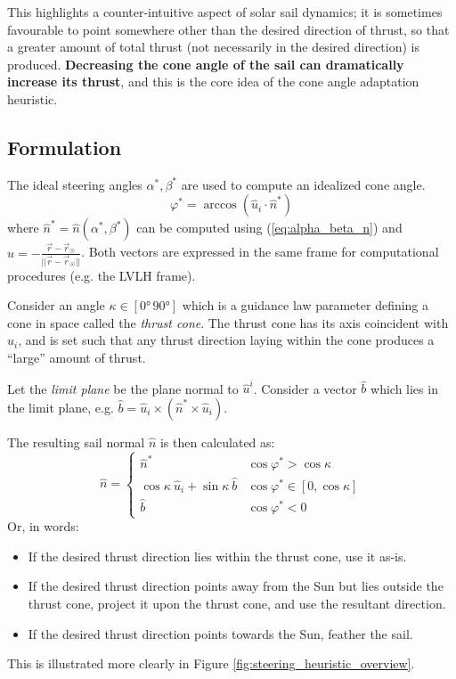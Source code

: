 This highlights a counter-intuitive aspect of solar sail dynamics; it is sometimes favourable to point somewhere other than the desired direction of thrust, so that a greater amount of total thrust (not necessarily in the desired direction) is produced. \textbf{Decreasing the cone angle of the sail can dramatically increase its thrust}, and this is the core idea of the cone angle adaptation heuristic.

\subsection{Formulation}
The ideal steering angles \(\alpha^*, \beta^*\) are used to compute an idealized cone angle.
\begin{equation}
  \varphi^* = \arccos(\hat{u}_i \cdot \hat{n}^*)
  \label{eq:cone_star}
\end{equation}
where \(\hat{n}^* = \hat{n}(\alpha^*, \beta^*)\) can be computed using (\ref{eq:alpha_beta_n}) and \(\hat{u} = -\frac{\vec{r} - \vec{r}_{\astrosun}}{||\vec{r} - \vec{r}_{\astrosun}||}\). Both vectors are expressed in the same frame for computational procedures (e.g. the LVLH frame).

Consider an angle \(\kappa \in [\ang{0}\, \ang{90}]\) which is a guidance law parameter defining a cone in space called the \textit{thrust cone}. The thrust cone has its axis coincident with \(\hat{u}_i\), and is set such that any thrust direction laying within the cone produces a ``large'' amount of thrust.

Let the \textit{limit plane} be the plane normal to \(\hat{u}^i\). Consider a vector \(\hat{b}\) which lies in the limit plane, e.g. \(\hat{b} = \hat{u}_i \times (\hat{n}^* \times \hat{u}_i)\).

The resulting sail normal \(\hat{n}\) is then calculated as:
\begin{equation}
  \hat{n} = \begin{cases}
    \hat{n}^*                                       & \cos \varphi^* > \cos \kappa          \\
    \cos \kappa \ \hat{u}_i + \sin \kappa \ \hat{b} & \cos \varphi^* \in  [ 0, \cos \kappa] \\
    \hat{b}                                         & \cos \varphi^* < 0
  \end{cases}
  \label{eq:ndf_law}
\end{equation}
Or, in words:
\begin{itemize}
  \item If the desired thrust direction lies within the thrust cone, use it as-is.
  \item If the desired thrust direction points away from the Sun but lies outside the thrust cone, project it upon the thrust cone, and use the resultant direction.
  \item If the desired thrust direction points towards the Sun, feather the sail.
\end{itemize}
This is illustrated more clearly in Figure \ref{fig:steering_heuristic_overview}.

